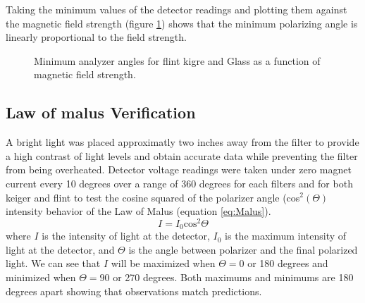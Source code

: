\documentclass[10pt,onecolumn]{article} %
\begin{document}
Taking the minimum values of the detector readings and plotting them against the magnetic field strength (figure \ref{fig:plot05}) shows that the minimum polarizing angle is linearly proportional to the field strength.
\begin{figure}

\caption{Minimum analyzer angles for flint kigre and Glass as a function of magnetic field strength.}\label{fig:plot05}
\end{figure}

\subsection{Law of malus Verification}
A bright light was placed approximatly two inches away from the filter to provide a high contrast of light levels and obtain accurate data while preventing the filter from being overheated. Detector voltage readings were taken under zero magnet current every 10 degrees over a range of 360 degrees for each filters and for both keiger and flint to test the cosine squared of the polarizer angle (cos$^2(\Theta)$ intensity behavior of the Law of Malus (equation \ref{eq:Malus}).
\begin{equation}\label{eq:Malus}
I = I_0 \mathrm{cos}^2 \Theta
\end{equation}
where $I$ is the intensity of light at the detector, $I_0$ is the maximum intensity of light at the detector, and $\Theta$ is the angle between polarizer and the final polarized light. We can see that $I$ will be maximized when $\Theta = 0$ or 180 degrees and minimized when $\Theta = 90$ or 270 degrees. Both maximums and minimums are 180 degrees apart showing that observations match predictions.

\end{document}
